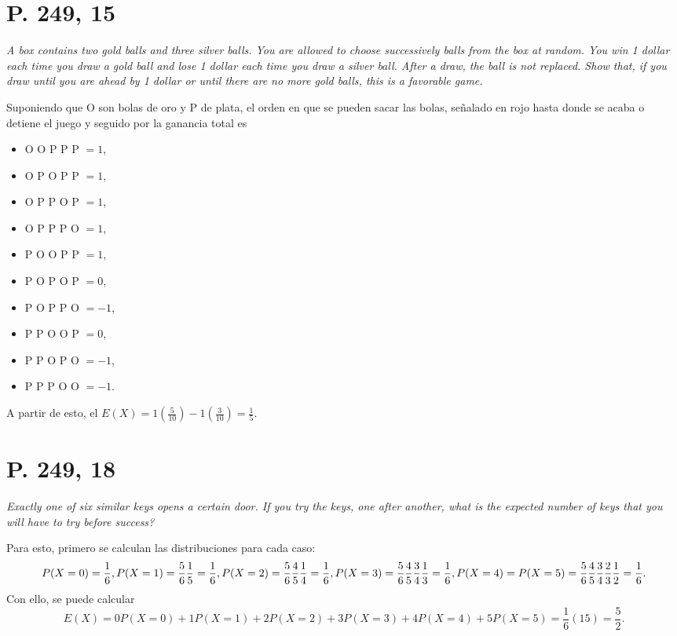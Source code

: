 \documentclass[paper=leter, fontsize=11pt]{scrartcl}
\numberwithin{equation}{section}		%
\numberwithin{figure}{section}			%
\numberwithin{table}{section}				%
\begin{document}
\section*{P. 249, 15}
\emph{A box contains two gold balls and three silver balls. You are allowed to choose successively balls from the box at random. You win 1 dollar each time you draw a gold ball and lose 1 dollar each time you draw a silver ball. After a draw, the ball is not replaced. Show that, if you draw until you are ahead by 1 dollar or until there are no more gold balls, this is a favorable game.}

Suponiendo que O son bolas de oro y P de plata, el orden en que se pueden sacar las bolas, señalado en rojo hasta donde se acaba o detiene el juego y seguido por la ganancia total es
\begin{itemize}
    \item \color{red}O \color{black} O P P P $= 1$,
    \item \color{red}O \color{black} P O P P $= 1$,
    \item \color{red}O \color{black} P P O P $= 1$,
    \item \color{red}O \color{black} P P P O $= 1$,
    \item \color{red}P O O \color{black} P P $= 1$,
    \item \color{red}P O P O \color{black} P $= 0$,
    \item \color{red}P O P P O \color{black} $= -1$,
    \item \color{red}P P O O \color{black} P $= 0$,
    \item \color{red}P P O P O \color{black} $= -1$,
    \item \color{red}P P P O O \color{black} $= -1$.
\end{itemize}

A partir de esto, el $E(X) = 1 (\frac{5}{10}) -1 (\frac{3}{10}) = \frac{1}{5}$.

\section*{P. 249, 18}
\emph{Exactly one of six similar keys opens a certain door. If you try the keys, one after another, what is the expected number of keys that you will have to try before success?}

Para esto, primero se calculan las distribuciones para cada caso:
\begin{dmath*}
    {P(X = 0) = \frac{1}{6}}, \\
    {P(X = 1) = \frac{5}{6} \frac{1}{5} = \frac{1}{6}}, \\
    {P(X = 2) = \frac{5}{6} \frac{4}{5} \frac{1}{4} = \frac{1}{6}}, \\
    {P(X = 3) = \frac{5}{6} \frac{4}{5} \frac{3}{4} \frac{1}{3} = \frac{1}{6}}, \\
    {P(X = 4) = P(X = 5) = \frac{5}{6} \frac{4}{5} \frac{3}{4} \frac{2}{3} \frac{1}{2} = \frac{1}{6}}.
\end{dmath*}
Con ello, se puede calcular
\begin{dmath*}
    E(X) = {0 P(X = 0) + 1 P(X = 1) + 2 P(X = 2) + 3 P(X = 3) + 4 P(X = 4) + 5 P(X = 5)} 
         = \frac{1}{6} (15)
         = \frac{5}{2}.
\end{dmath*}
\end{document}
